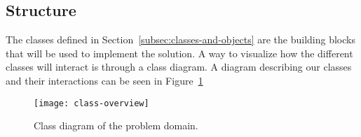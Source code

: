 \subsection{Structure}\label{subsec:structure}

The classes defined in Section~\ref{subsec:classes-and-objects} are the building blocks that will be used
to implement the solution.
A way to visualize how the different classes will interact is through a class diagram.
A diagram describing our classes and their interactions can be seen in Figure~\ref{fig:pda-class-diagram}

\begin{figure}[H]
    \centering
    \texttt{[image: class-overview]}
    \caption{Class diagram of the problem domain.}\label{fig:pda-class-diagram}
\end{figure}
